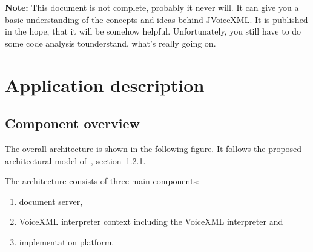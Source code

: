 \documentclass[11pt,a4paper]{article}
\begin{document}
\textbf{Note: } This document is not complete, probably it never will. It can
give you a basic understanding of the concepts and ideas behind JVoiceXML. It
is published in the hope, that it will be somehow helpful.
Unfortunately, you still have to do some code analysis tounderstand, what's
really going on.

\section{Application description}
\label{sec:appl-descr}

\subsection{Component overview}
\label{sec:component-overview}

The overall architecture is shown in the following figure.
It follows the proposed architectural model of~\cite{w3.org:voicexml}, 
section~1.2.1. 
\begin{center}
\end{center}

The architecture consists of three main components:
\begin{enumerate}
\item document server,
\item VoiceXML interpreter context including the VoiceXML interpreter and
\item implementation platform.
\end{enumerate}
\end{document}
